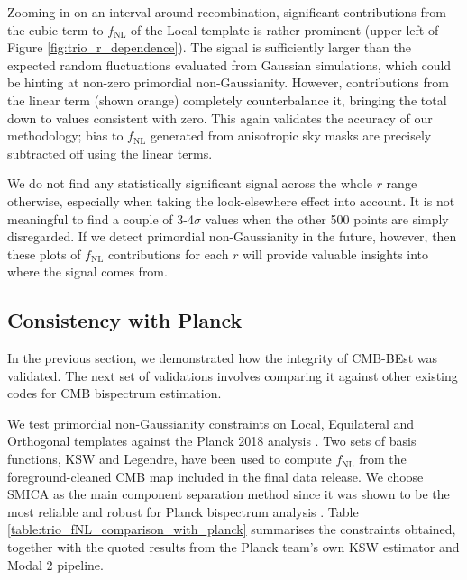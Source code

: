 Zooming in on an interval around recombination, significant contributions from the cubic term to $f_\text{NL}$ of the Local template is rather prominent (upper left of Figure \ref{fig:trio_r_dependence}). The signal is sufficiently larger than the expected random fluctuations evaluated from Gaussian simulations, which could be hinting at non-zero primordial non-Gaussianity. However, contributions from the linear term (shown orange) completely counterbalance it, bringing the total down to values consistent with zero. This again validates the accuracy of our methodology; bias to $f_\text{NL}$ generated from anisotropic sky masks are precisely subtracted off using the linear terms.

We do not find any statistically significant signal across the whole $r$ range otherwise, especially when taking the look-elsewhere effect into account. It is not meaningful to find a couple of 3-4$\sigma$ values when the other 500 points are simply disregarded. If we detect primordial non-Gaussianity in the future, however, then these plots of $f_\text{NL}$ contributions for each $r$ will provide valuable insights into where the signal comes from.



\subsection{Consistency with Planck} \label{section:consistency_with_Planck}

In the previous section, we demonstrated how the integrity of CMB-BEst was validated. The next set of validations involves comparing it against other existing codes for CMB bispectrum estimation.

We test primordial non-Gaussianity constraints on Local, Equilateral and Orthogonal templates against the Planck 2018 analysis \cite{PlanckCollaboration2018}. Two sets of basis functions, KSW and Legendre, have been used to compute $f_\text{NL}$ from the foreground-cleaned CMB map included in the final data release. We choose SMICA as the main component separation method since it was shown to be the most reliable and robust for Planck bispectrum analysis \cite{PlanckCollaboration2013ComponentSeparation, PlanckCollaboration2013,PlanckCollaboration2015,PlanckCollaboration2018}. Table \ref{table:trio_fNL_comparison_with_planck} summarises the constraints obtained, together with the quoted results from the Planck team's own KSW estimator and Modal 2 pipeline.

